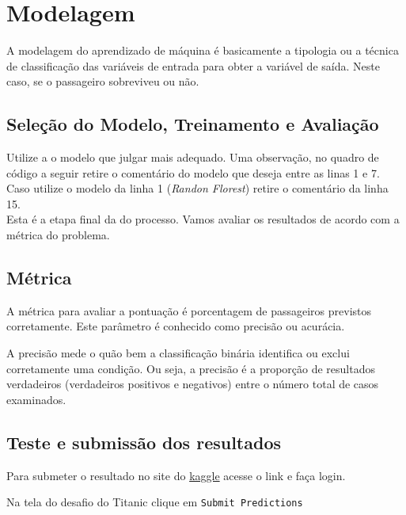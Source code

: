 \documentclass[a4paper,12pt]{report}
\begin{document}


\section{Modelagem}

A modelagem do aprendizado de máquina é basicamente a tipologia ou a técnica de classificação das variáveis de entrada para obter a variável de saída. Neste caso, se o passageiro sobreviveu ou não.

\subsection{Seleção do Modelo, Treinamento e Avaliação}

Utilize a o modelo que julgar mais adequado. Uma observação, no quadro de código a seguir retire o comentário do modelo que deseja entre as linas 1 e 7. Caso utilize o modelo da linha 1 (\textit{Randon Florest}) retire o comentário da linha 15.\\



Esta é a etapa final da do processo. Vamos avaliar os resultados de acordo com a métrica do problema.

\subsection{Métrica}

A métrica para avaliar a pontuação é porcentagem de passageiros previstos corretamente. Este parâmetro é conhecido como precisão ou acurácia.

A precisão mede o quão bem a classificação binária identifica ou exclui corretamente uma condição. Ou seja, a precisão é a proporção de resultados verdadeiros (verdadeiros positivos e negativos) entre o número total de casos examinados.

\subsection{Teste e submissão dos resultados}

Para submeter o resultado no site do \href{https://www.kaggle.com/c/titanic}{kaggle} acesse o link e faça login.

Na tela do desafio do Titanic clique em \texttt{Submit Predictions}
\end{document}
